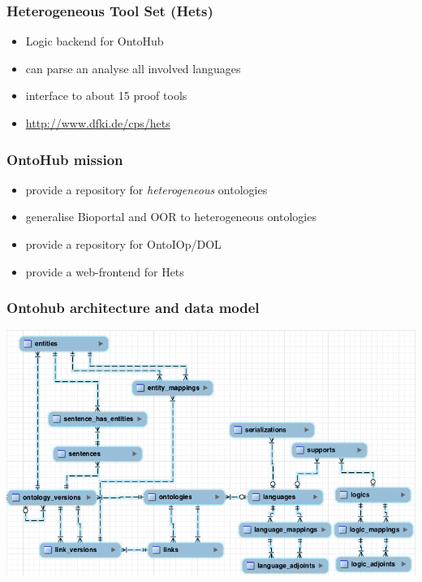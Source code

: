 \documentclass[german]{beamer}
\begin{document}
\begin{frame}
\frametitle{Heterogeneous Tool Set (Hets)}
\begin{itemize}
\item Logic backend for OntoHub
\item can parse an analyse all involved languages
\item interface to about 15 proof tools
\item \url{http://www.dfki.de/cps/hets}
\end{itemize}
\end{frame}


\begin{frame}
\frametitle{OntoHub mission}
\begin{itemize}
\item provide a repository for \emph{heterogeneous} ontologies
\item generalise Bioportal and OOR to heterogeneous ontologies
\item provide a repository for OntoIOp/DOL
\item provide a web-frontend for Hets
\end{itemize}
\end{frame}

\begin{frame}
\frametitle{Ontohub architecture and data model}
\includegraphics[width=\textwidth]{DBVisualization.png}
\end{frame}
\end{document}

